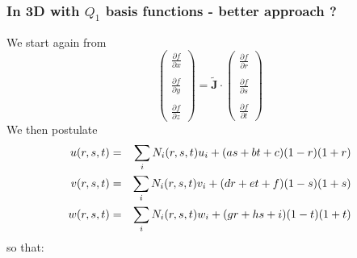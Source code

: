 \subsubsection{In 3D with $Q_1$ basis functions - better approach ?}

We start again from 
\[
\left(
\begin{array}{c}
\frac{\partial f}{\partial x} \\ \\
\frac{\partial f}{\partial y} \\ \\
\frac{\partial f}{\partial z} 
\end{array}
\right)
=
\tilde{\bm J} \cdot
\left(
\begin{array}{c}
\frac{\partial f}{\partial r} \\ \\
\frac{\partial f}{\partial s} \\ \\ 
\frac{\partial f}{\partial t} 
\end{array}
\right)
\]
We then postulate 
\begin{eqnarray}
u(r,s,t)&=&\sum_i N_i(r,s,t) u_i + (a s + b t +c)(1-r)(1+r) \nonumber\\
v(r,s,t)&=&\sum_i N_i(r,s,t) v_i + (d r + e t +f)(1-s)(1+s) \nonumber\\
w(r,s,t)&=&\sum_i N_i(r,s,t) w_i + (g r + h s +i)(1-t)(1+t) \nonumber
\end{eqnarray}
so that:

